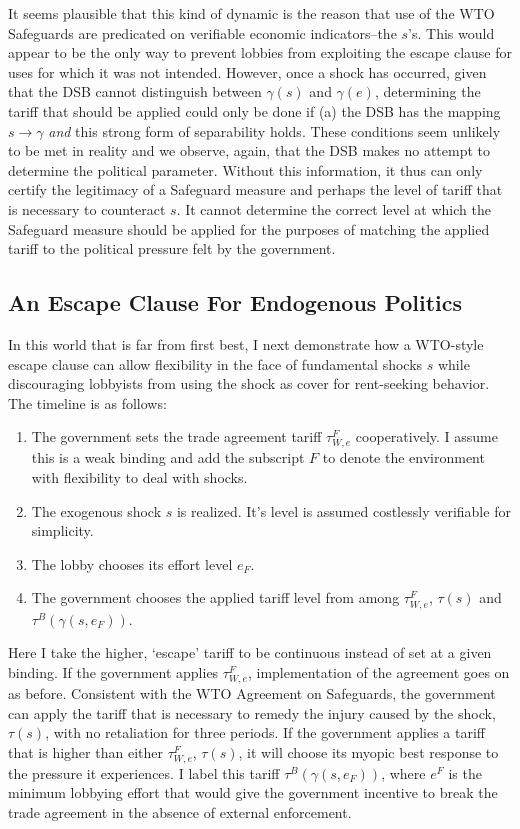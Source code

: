 \documentclass[12pt]{article}
\newcommand{\ga}{\gamma}
\begin{document}
It seems plausible that this kind of dynamic is the reason that use of the WTO Safeguards are predicated on verifiable economic indicators--the $s$'s. This would appear to be the only way to prevent lobbies from exploiting the escape clause for uses for which it was not intended. However, once a shock has occurred, given that the DSB cannot distinguish between $\ga(s)$ and $\ga(e)$, determining the tariff that should be applied could only be done if (a) the DSB has the mapping $s \rightarrow \ga$ \textit{and} this strong form of separability holds. These conditions seem unlikely to be met in reality and we observe, again, that the DSB makes no attempt to determine the political parameter. Without this information, it thus can only certify the legitimacy of a Safeguard measure and perhaps the level of tariff that is necessary to counteract $s$. It cannot determine the correct level at which the Safeguard measure should be applied for the purposes of matching the applied tariff to the political pressure felt by the government.

\subsection{An Escape Clause For Endogenous Politics}
\label{sec:ECendog}
In this world that is far from first best, I next demonstrate how a WTO-style escape clause can allow flexibility in the face of fundamental shocks $s$ while discouraging lobbyists from using the shock as cover for rent-seeking behavior. The timeline is as follows:
\begin{enumerate}
	\item The government sets the trade agreement tariff $\tau^F_{W,e}$ cooperatively. I assume this is a weak binding and add the subscript $F$ to denote the environment with flexibility to deal with shocks.
	\item The exogenous shock $s$ is realized. It's level is assumed costlessly verifiable for simplicity.
	\item The lobby chooses its effort level $e_F$.
	\item The government chooses the applied tariff level from among $\tau^F_{W,e}$, $\tau(s)$ and $\tau^B(\ga(s,e_F))$.
\end{enumerate}
Here I take the higher, `escape' tariff to be continuous instead of set at a given binding. If the government applies $\tau^F_{W,e}$, implementation of the agreement goes on as before. Consistent with the WTO Agreement on Safeguards, the government can apply the tariff that is necessary to remedy the injury caused by the shock, $\tau(s)$, with no retaliation for three periods. If the government applies a tariff that is higher than either $\tau^F_{W,e}$, $\tau(s)$, it will choose its myopic best response to the pressure it experiences. I label this tariff $\tau^B(\ga(s,e_F))$, where $e^F$ is the minimum lobbying effort that would give the government incentive to break the trade agreement in the absence of external enforcement.
\end{document}
